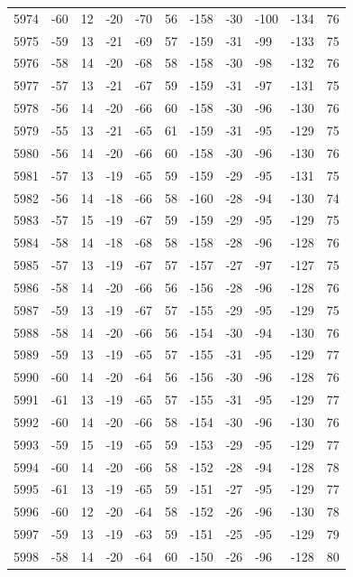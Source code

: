 \begin{table}[H]
\begin{tabular}{lllllllllll}
5974 & -60 & 12 & -20 & -70 & 56 & -158 & -30 & -100 & -134 & 76 \\
5975 & -59 & 13 & -21 & -69 & 57 & -159 & -31 & -99 & -133 & 75 \\
5976 & -58 & 14 & -20 & -68 & 58 & -158 & -30 & -98 & -132 & 76 \\
5977 & -57 & 13 & -21 & -67 & 59 & -159 & -31 & -97 & -131 & 75 \\
5978 & -56 & 14 & -20 & -66 & 60 & -158 & -30 & -96 & -130 & 76 \\
5979 & -55 & 13 & -21 & -65 & 61 & -159 & -31 & -95 & -129 & 75 \\
5980 & -56 & 14 & -20 & -66 & 60 & -158 & -30 & -96 & -130 & 76 \\
5981 & -57 & 13 & -19 & -65 & 59 & -159 & -29 & -95 & -131 & 75 \\
5982 & -56 & 14 & -18 & -66 & 58 & -160 & -28 & -94 & -130 & 74 \\
5983 & -57 & 15 & -19 & -67 & 59 & -159 & -29 & -95 & -129 & 75 \\
5984 & -58 & 14 & -18 & -68 & 58 & -158 & -28 & -96 & -128 & 76 \\
5985 & -57 & 13 & -19 & -67 & 57 & -157 & -27 & -97 & -127 & 75 \\
5986 & -58 & 14 & -20 & -66 & 56 & -156 & -28 & -96 & -128 & 76 \\
5987 & -59 & 13 & -19 & -67 & 57 & -155 & -29 & -95 & -129 & 75 \\
5988 & -58 & 14 & -20 & -66 & 56 & -154 & -30 & -94 & -130 & 76 \\
5989 & -59 & 13 & -19 & -65 & 57 & -155 & -31 & -95 & -129 & 77 \\
5990 & -60 & 14 & -20 & -64 & 56 & -156 & -30 & -96 & -128 & 76 \\
5991 & -61 & 13 & -19 & -65 & 57 & -155 & -31 & -95 & -129 & 77 \\
5992 & -60 & 14 & -20 & -66 & 58 & -154 & -30 & -96 & -130 & 76 \\
5993 & -59 & 15 & -19 & -65 & 59 & -153 & -29 & -95 & -129 & 77 \\
5994 & -60 & 14 & -20 & -66 & 58 & -152 & -28 & -94 & -128 & 78 \\
5995 & -61 & 13 & -19 & -65 & 59 & -151 & -27 & -95 & -129 & 77 \\
5996 & -60 & 12 & -20 & -64 & 58 & -152 & -26 & -96 & -130 & 78 \\
5997 & -59 & 13 & -19 & -63 & 59 & -151 & -25 & -95 & -129 & 79 \\
5998 & -58 & 14 & -20 & -64 & 60 & -150 & -26 & -96 & -128 & 80 \\

\end{tabular}
\end{table}
